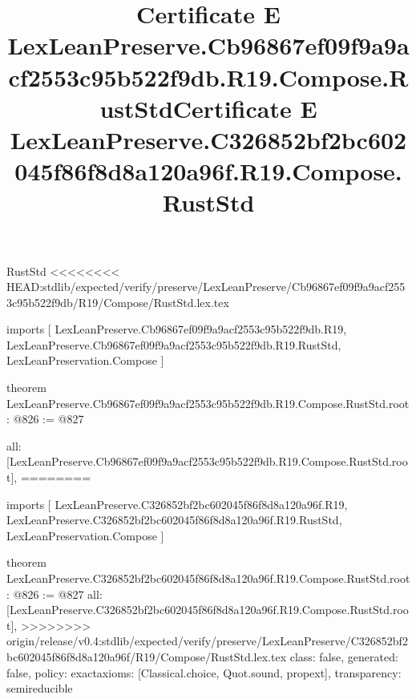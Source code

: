 \begin{lexlean}{RustStd}
<<<<<<<< HEAD:stdlib/expected/verify/preserve/LexLeanPreserve/Cb96867ef09f9a9acf2553c95b522f9db/R19/Compose/RustStd.lex.tex
\title{Certificate E LexLeanPreserve.Cb96867ef09f9a9acf2553c95b522f9db.R19.Compose.RustStd}
\begin{coremodule}
imports [
  LexLeanPreserve.Cb96867ef09f9a9acf2553c95b522f9db.R19,
  LexLeanPreserve.Cb96867ef09f9a9acf2553c95b522f9db.R19.RustStd,
  LexLeanPreservation.Compose
]

theorem LexLeanPreserve.Cb96867ef09f9a9acf2553c95b522f9db.R19.Compose.RustStd.root : @826 := @827 {
  all: [LexLeanPreserve.Cb96867ef09f9a9acf2553c95b522f9db.R19.Compose.RustStd.root],
========
\title{Certificate E LexLeanPreserve.C326852bf2bc602045f86f8d8a120a96f.R19.Compose.RustStd}
\begin{coremodule}
imports [
  LexLeanPreserve.C326852bf2bc602045f86f8d8a120a96f.R19,
  LexLeanPreserve.C326852bf2bc602045f86f8d8a120a96f.R19.RustStd,
  LexLeanPreservation.Compose
]

theorem LexLeanPreserve.C326852bf2bc602045f86f8d8a120a96f.R19.Compose.RustStd.root : @826 := @827 {
  all: [LexLeanPreserve.C326852bf2bc602045f86f8d8a120a96f.R19.Compose.RustStd.root],
>>>>>>>> origin/release/v0.4:stdlib/expected/verify/preserve/LexLeanPreserve/C326852bf2bc602045f86f8d8a120a96f/R19/Compose/RustStd.lex.tex
  class: false,
  generated: false,
  policy: exact{axioms: [Classical.choice, Quot.sound, propext]},
  transparency: semireducible
}


\end{coremodule}}
\end{coremodule}
\end{lexlean}
